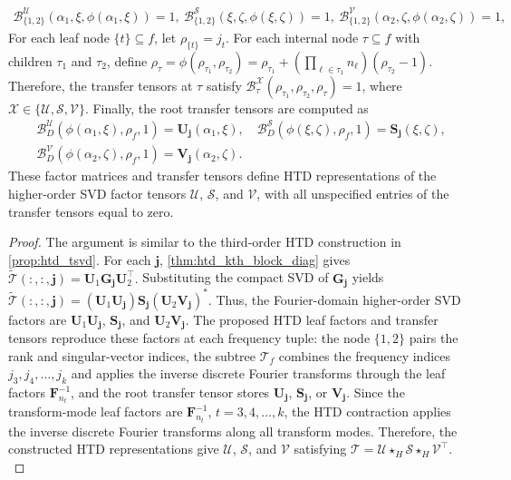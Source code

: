 \documentclass[onefignum,onetabnum]{siamart250211}
\begin{document}
\begin{proposition}
\begin{align*}
\mathscr{B}^{\mathscr{U}}_{\{1,2\}}(\alpha_1,\xi,\phi(\alpha_1,\xi))=1,\
\mathscr{B}^{\mathscr{S}}_{\{1,2\}}(\xi,\zeta,\phi(\xi,\zeta))=1,\
\mathscr{B}^{\mathscr{V}}_{\{1,2\}}(\alpha_2,\zeta,\phi(\alpha_2,\zeta))=1,
\end{align*}
For each leaf node $\{t\}\subseteq f$, let
$\rho_{\{t\}}=j_t$. For each internal node
$\tau\subseteq f$ with children $\tau_1$ and $\tau_2$, define $\rho_\tau = \phi(\rho_{\tau_1},\rho_{\tau_2}) = \rho_{\tau_1} + (\prod_{\ell\in\tau_1}n_\ell) (\rho_{\tau_2}-1).$
Therefore, %
the transfer tensors at $\tau$ satisfy
$
\mathscr{B}^{\mathscr{X}}_{\tau}
(\rho_{\tau_1},
\rho_{\tau_2},
\rho_\tau)=1$,
 where $\mathscr{X}\in\{\mathscr{U},\mathscr{S},\mathscr{V}\}$.
Finally, the %
root transfer tensors are computed as
\begin{align*}
&\mathscr{B}^{\mathscr{U}}_{D}(\phi(\alpha_1,\xi),\rho_f,1)
=
\textbf{U}_{\boldsymbol{j}}(\alpha_1,\xi),\quad
\mathscr{B}^{\mathscr{S}}_{D}(\phi(\xi,\zeta),\rho_f,1)
=
\boldsymbol{S}_{\boldsymbol{j}}(\xi,\zeta),\\
&\mathscr{B}^{\mathscr{V}}_{D}(\phi(\alpha_2,\zeta),\rho_f,1)
=
\textbf{V}_{\boldsymbol{j}}(\alpha_2,\zeta).
\end{align*}
These factor matrices and transfer tensors define HTD representations of the higher-order SVD factor tensors $\mathscr{U}$, $\mathscr{S}$, and $\mathscr{V}$, with all unspecified entries of the transfer tensors equal to zero.
\end{proposition}


\begin{proof}
The argument is similar to the third-order HTD construction in \cref{prop:htd_tsvd}. For each $\boldsymbol{j}$, \cref{thm:htd_kth_block_diag} gives $\widetilde{\mathscr{T}}(:,:, \boldsymbol{j})
=
\textbf{U}_1
\textbf{G}_{\boldsymbol{j}}
\textbf{U}_2^\top.$
Substituting the compact SVD of $\textbf{G}_{\boldsymbol{j}}$ yields $\widetilde{\mathscr{T}}(:,:, \boldsymbol{j})
=
(\textbf{U}_1\textbf{U}_{\boldsymbol{j}})
\boldsymbol{S}_{\boldsymbol{j}}
(\textbf{U}_2\textbf{V}_{\boldsymbol{j}})^* .$
Thus, the Fourier-domain higher-order SVD factors are
$\textbf{U}_1\textbf{U}_{\boldsymbol{j}}$,
$\boldsymbol{S}_{\boldsymbol{j}}$, and
$\textbf{U}_2\textbf{V}_{\boldsymbol{j}}$. The proposed HTD leaf factors
and transfer tensors reproduce these factors at each frequency tuple: the node
$\{1,2\}$ pairs the rank and singular-vector indices, the subtree $\mathcal{T}_f$ combines the frequency indices $j_3,j_4, \dots,j_k$ and applies the inverse discrete Fourier transforms through the leaf factors $\textbf{F}_{n_t}^{-1}$, and the root transfer tensor stores
$\textbf{U}_{\boldsymbol{j}}$,
$\boldsymbol{S}_{\boldsymbol{j}}$, or
$\textbf{V}_{\boldsymbol{j}}$. Since the transform-mode leaf factors are
$\textbf{F}_{n_t}^{-1}$, $t=3, 4, \dots,k$, the HTD contraction applies the inverse
discrete Fourier transforms along all transform modes. Therefore, the constructed HTD
representations give $\mathscr{U}$, $\mathscr{S}$, and $\mathscr{V}$ satisfying $\mathscr{T}=\mathscr{U}\star_H\mathscr{S}\star_H\mathscr{V}^{\top}.$
\end{proof}
\end{document}
